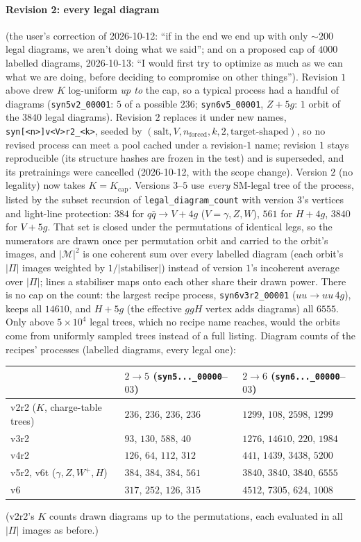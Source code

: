 \documentclass[11pt]{article}
\newcommand{\code}[1]{\texttt{#1}}
\begin{document}
\paragraph{Revision 2: every legal diagram} (the user's correction of 2026-10-12: ``if in the end we end up with only
$\sim200$ legal diagrams, we aren't doing what we said''; and on a proposed cap of $4000$ labelled diagrams, 2026-10-13:
``I would first try to optimize as much as we can what we are doing, before deciding to compromise on other things''). Revision $1$ above drew $K$ log-uniform \emph{up to} the cap,
so a typical process had a handful of diagrams (\code{syn5v2\_00001}: $5$ of a possible $236$; \code{syn6v5\_00001},
$Z+5g$: $1$ orbit of the $3840$ legal diagrams). Revision $2$ replaces it under new names, \code{syn[<n>]v<V>r2\_<k>},
seeded by $(\text{salt},V,n_\text{forced},k,2,\text{target-shaped})$, so no revised process can meet a pool cached
under a revision-$1$ name; revision $1$ stays reproducible (its structure hashes are frozen in the test) and is
superseded, and its pretrainings were cancelled (2026-10-12, with the scope change). Version $2$ (no legality) now takes
$K=K_\text{cap}$. Versions $3$--$5$ use \emph{every} SM-legal tree of the process, listed by the subset recursion of
\code{legal\_diagram\_count} with version $3$'s vertices and light-line protection: $384$ for $q\bar q\to V+4g$ ($V=\gamma,
Z,W$), $561$ for $H+4g$, $3840$ for $V+5g$. That set is closed under the permutations of identical legs, so the
numerators are drawn once per permutation orbit and carried to the orbit's images, and $|\mathcal M|^2$ is one
coherent sum over every labelled diagram (each orbit's $|\Pi|$ images weighted by $1/|\text{stabiliser}|$) instead of
version $1$'s incoherent average over $|\Pi|$; lines a stabiliser maps onto each other share their drawn power. There
is no cap on the count: the largest recipe process, \code{syn6v3r2\_00001} ($uu\to uu\,4g$), keeps all $14610$, and
$H+5g$ (the effective $ggH$ vertex adds diagrams) all $6555$. Only above $5\times10^4$ legal trees, which no recipe
name reaches, would the orbits come from uniformly sampled trees instead of a full listing.
Diagram counts of the recipes' processes (labelled diagrams, every legal one):
\begin{center}\small
\begin{tabular}{lll}
 & $2\to5$ (\code{syn5...\_00000}--$03$) & $2\to6$ (\code{syn6...\_00000}--$03$) \\ \hline
v2r2 ($K$, charge-table trees) & $236$, $236$, $236$, $236$ & $1299$, $108$, $2598$, $1299$ \\
v3r2 & $93$, $130$, $588$, $40$ & $1276$, $14610$, $220$, $1984$ \\
v4r2 & $126$, $64$, $112$, $312$ & $441$, $1439$, $3438$, $5200$ \\
v5r2, v6t ($\gamma,Z,W^+,H$) & $384$, $384$, $384$, $561$ & $3840$, $3840$, $3840$, $6555$ \\
v6 & $317$, $252$, $126$, $315$ & $4512$, $7305$, $624$, $1008$ \\
\end{tabular}
\end{center}
(v2r2's $K$ counts drawn diagrams up to the permutations, each evaluated in all $|\Pi|$ images as before.)
\end{document}
